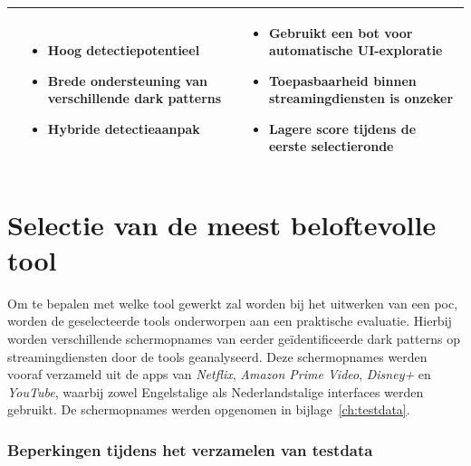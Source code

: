 \begin{table}[H]
\begin{tabular}{
            >{\raggedright\arraybackslash\small}p{2.5cm}
            >{\raggedright\arraybackslash\small}p{6cm}
            >{\raggedright\arraybackslash\small}p{6cm}
        }
        \raisebox{-0.25cm}{AppRay} &
        \begin{itemize}[leftmargin=12pt,label=+,itemsep=0pt,topsep=0pt,parsep=0pt,partopsep=0pt]
            \item Hoog detectiepotentieel
            \item Brede ondersteuning van verschillende dark patterns
            \item Hybride detectieaanpak
        \end{itemize} 
        &
        \begin{itemize}[leftmargin=12pt,label=-,itemsep=0pt,topsep=0pt,parsep=0pt,partopsep=0pt]
            \item Gebruikt een bot voor automatische UI-exploratie
            \item Toepasbaarheid binnen streamingdiensten is onzeker
            \item Lagere score tijdens de eerste selectieronde
        \end{itemize} \\
        
        \bottomrule
    \end{tabular}
\end{table}

\newpage

\section{Selectie van de meest beloftevolle tool}
\label{sec:selectiebeloftevolletool}

\vspace{1em}

Om te bepalen met welke tool gewerkt zal worden bij het uitwerken van een \acrlong{poc}, worden de geselecteerde tools onderworpen aan een praktische evaluatie. Hierbij worden verschillende schermopnames van eerder geïdentificeerde dark patterns op streamingdiensten door de tools  geanalyseerd. Deze schermopnames werden vooraf verzameld uit de apps van \textit{Netflix}, \textit{Amazon Prime Video}, \textit{Disney+} en \textit{YouTube}, waarbij zowel Engelstalige als Nederlandstalige interfaces werden gebruikt. De schermopnames werden opgenomen in bijlage~\ref{ch:testdata}.

\vspace{1em}

\subsubsection{Beperkingen tijdens het verzamelen van testdata}


